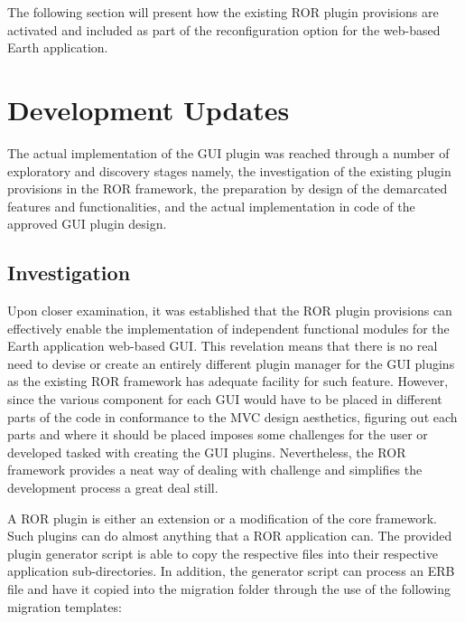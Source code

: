 \documentclass{article}
\begin{document}
\noindent
The following section will present how the existing ROR plugin provisions are activated and included as part of the reconfiguration option for the web-based Earth application.


\section{Development Updates} %

\noindent
The actual implementation of the GUI plugin was reached through a number of exploratory and discovery stages namely, the investigation of the existing plugin provisions in the ROR framework, the preparation by design of the demarcated features and functionalities, and the actual implementation in code of the approved GUI plugin design. 

\subsection{Investigation} %

\noindent
Upon closer examination, it was established that the ROR plugin provisions can effectively enable the implementation of independent functional modules for the Earth application web-based GUI. This revelation means that there is no real need to devise or create an entirely different plugin manager for the GUI plugins as the existing ROR framework has adequate facility for such feature. However, since the various component for each GUI would have to be placed in different parts of the code in conformance to the MVC design aesthetics, figuring out each parts and where it should be placed imposes some challenges for the user or developed tasked with creating the GUI plugins. Nevertheless, the ROR framework provides a neat way of dealing with challenge and simplifies the development process a great deal still. 

\noindent
A ROR plugin is either an extension or a modification of the core framework. Such plugins can do almost anything that a ROR application can. The provided plugin generator script is able to copy the respective files into their respective application sub-directories. In addition, the generator script can process an ERB file and have it copied into the migration folder through the use of the following migration templates: 
\end{document}

